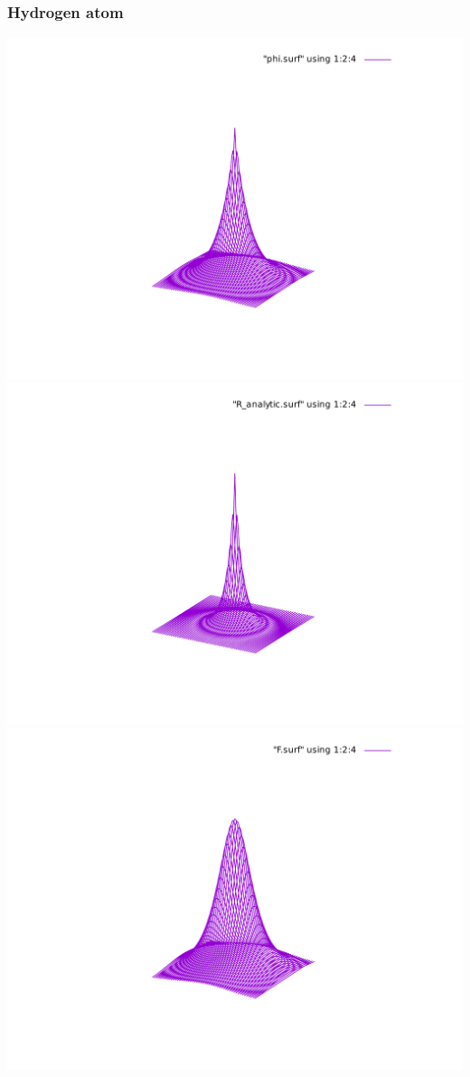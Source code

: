 \begin{frame}
\frametitle{Hydrogen atom}
\scriptsize

\includegraphics[scale=0.35, viewport = 175 90 430 400, clip]{figures/phi.pdf}
\includegraphics[scale=0.35, viewport = 175 90 430 400, clip]{figures/R.pdf}
\includegraphics[scale=0.35, viewport = 175 90 430 400, clip]{figures/F.pdf}\\


\end{frame}
